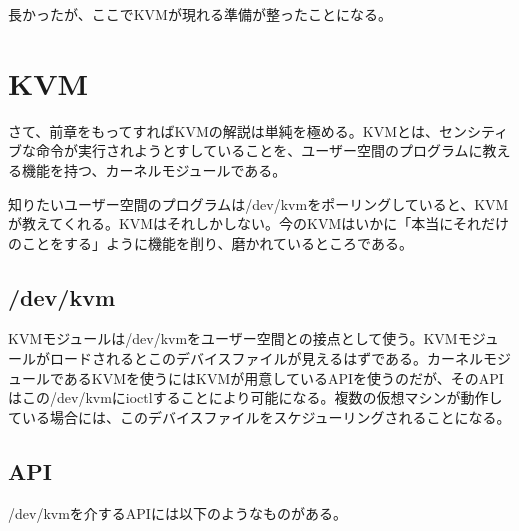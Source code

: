 \documentclass[9pt,b5paper,tombo]{jsbook}
\begin{document}
長かったが、ここでKVMが現れる準備が整ったことになる。

\section{KVM}

さて、前章をもってすればKVMの解説は単純を極める。KVMとは、センシティブな命令が実行されようとすしていることを、ユーザー空間のプログラムに教える機能を持つ、カーネルモジュールである。

知りたいユーザー空間のプログラムは/dev/kvmをポーリングしていると、KVMが教えてくれる。KVMはそれしかしない。今のKVMはいかに「本当にそれだけのことをする」ように機能を削り、磨かれているところである。

\subsection{/dev/kvm}

KVMモジュールは/dev/kvmをユーザー空間との接点として使う。KVMモジュールがロードされるとこのデバイスファイルが見えるはずである。カーネルモジュールであるKVMを使うにはKVMが用意しているAPIを使うのだが、そのAPIはこの/dev/kvmにioctlすることにより可能になる。複数の仮想マシンが動作している場合には、このデバイスファイルをスケジューリングされることになる。

\subsection{API}

/dev/kvmを介するAPIには以下のようなものがある。
\end{document}
